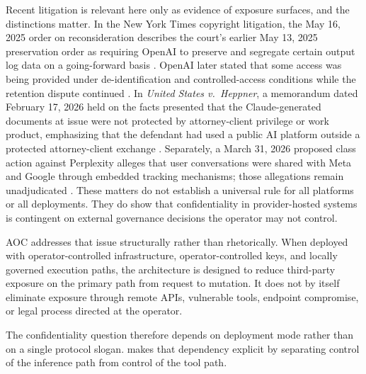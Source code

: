 \documentclass[11pt]{article}
\theoremstyle{remark}
\newcommand{\AOC}{\textup{\textsc{AOC}}}
\begin{document}
Recent litigation is relevant here only as evidence of exposure surfaces, and the distinctions matter. In the New York Times copyright litigation, the May 16, 2025 order on reconsideration describes the court's earlier May 13, 2025 preservation order as requiring OpenAI to preserve and segregate certain output log data on a going-forward basis \cite{nytopenai2025preservation}. OpenAI later stated that some access was being provided under de-identification and controlled-access conditions while the retention dispute continued \cite{openainyt2025update}. In \emph{United States v.\ Heppner}, a memorandum dated February 17, 2026 held on the facts presented that the Claude-generated documents at issue were not protected by attorney-client privilege or work product, emphasizing that the defendant had used a public AI platform outside a protected attorney-client exchange \cite{heppner2026}. Separately, a March 31, 2026 proposed class action against Perplexity alleges that user conversations were shared with Meta and Google through embedded tracking mechanisms; those allegations remain unadjudicated \cite{perplexitycomplaint2026}. These matters do not establish a universal rule for all platforms or all deployments. They do show that confidentiality in provider-hosted systems is contingent on external governance decisions the operator may not control.

\AOC{} addresses that issue structurally rather than rhetorically. When deployed with operator-controlled infrastructure, operator-controlled keys, and locally governed execution paths, the architecture is designed to reduce third-party exposure on the primary path from request to mutation. It does not by itself eliminate exposure through remote APIs, vulnerable tools, endpoint compromise, or legal process directed at the operator.

The confidentiality question therefore depends on deployment mode rather than on a single protocol slogan.  makes that dependency explicit by separating control of the inference path from control of the tool path.
\end{document}
